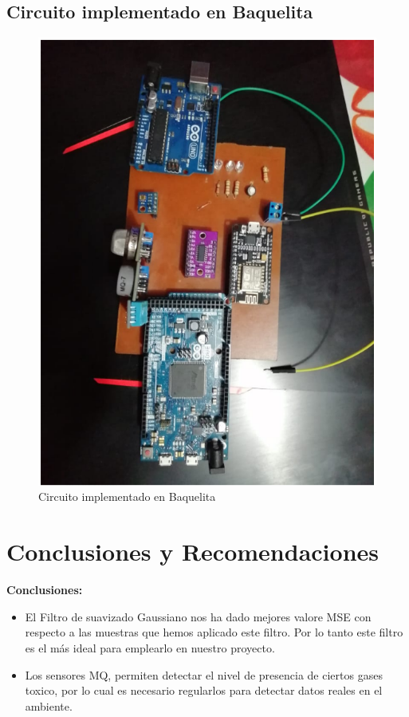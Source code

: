 \documentclass[10pt,a4paper]{article}
\begin{document}
\begin{multicols}{2}
\begin{itemize}
\subsection{Circuito implementado en Baquelita}

\begin{figure}[H]
\centering
\includegraphics[scale=0.6]{dueyplaca.PNG}
\caption{Circuito implementado en Baquelita}
\end{figure}



\section{Conclusiones y Recomendaciones}

\textbf{Conclusiones:}
\begin{itemize}
\renewcommand{\labelitemi}{$-$}

\item El Filtro de suavizado Gaussiano nos ha dado mejores valore MSE con respecto a las muestras que hemos aplicado este filtro. Por lo tanto este filtro es el más ideal para emplearlo en nuestro proyecto.\\
\item Los sensores MQ, permiten detectar el nivel de presencia de ciertos gases toxico, por lo cual es necesario regularlos para detectar datos reales en el ambiente.\\


\end{itemize}
\end{itemize}
\end{multicols}
\end{document}
